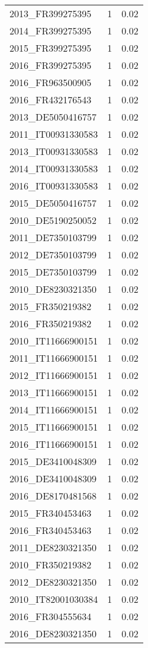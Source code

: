 \begin{table*}[htbp]
\begin{tabular}{lrr}
2013_FR399275395 & 1 & 0.02 \\
2014_FR399275395 & 1 & 0.02 \\
2015_FR399275395 & 1 & 0.02 \\
2016_FR399275395 & 1 & 0.02 \\
2016_FR963500905 & 1 & 0.02 \\
2016_FR432176543 & 1 & 0.02 \\
2013_DE5050416757 & 1 & 0.02 \\
2011_IT00931330583 & 1 & 0.02 \\
2013_IT00931330583 & 1 & 0.02 \\
2014_IT00931330583 & 1 & 0.02 \\
2016_IT00931330583 & 1 & 0.02 \\
2015_DE5050416757 & 1 & 0.02 \\
2010_DE5190250052 & 1 & 0.02 \\
2011_DE7350103799 & 1 & 0.02 \\
2012_DE7350103799 & 1 & 0.02 \\
2015_DE7350103799 & 1 & 0.02 \\
2010_DE8230321350 & 1 & 0.02 \\
2015_FR350219382 & 1 & 0.02 \\
2016_FR350219382 & 1 & 0.02 \\
2010_IT11666900151 & 1 & 0.02 \\
2011_IT11666900151 & 1 & 0.02 \\
2012_IT11666900151 & 1 & 0.02 \\
2013_IT11666900151 & 1 & 0.02 \\
2014_IT11666900151 & 1 & 0.02 \\
2015_IT11666900151 & 1 & 0.02 \\
2016_IT11666900151 & 1 & 0.02 \\
2015_DE3410048309 & 1 & 0.02 \\
2016_DE3410048309 & 1 & 0.02 \\
2016_DE8170481568 & 1 & 0.02 \\
2015_FR340453463 & 1 & 0.02 \\
2016_FR340453463 & 1 & 0.02 \\
2011_DE8230321350 & 1 & 0.02 \\
2010_FR350219382 & 1 & 0.02 \\
2012_DE8230321350 & 1 & 0.02 \\
2010_IT82001030384 & 1 & 0.02 \\
2016_FR304555634 & 1 & 0.02 \\
2016_DE8230321350 & 1 & 0.02 \\

\end{tabular}
\end{table*}

